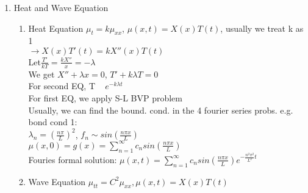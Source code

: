 \documentclass[10pt]{article}
\begin{document}
\begin{multicols}{2}
\begin{enumerate}
\begin{enumerate}
		\end{enumerate}
	
	\item Heat and Wave Equation
		\begin{enumerate}
			\item Heat Equation
				$\mu_t = k\mu_{xx}$, $\mu(x,t) = X(x)T(t)$, usually we treat k as 1\\
				$\rightarrow X(x)T'(t) = kX''(x)T(t)$\\
				Let$\frac{T'}{kT} = \frac{kX''}{x} = -\lambda$\\
				We get $X'' + \lambda x = 0$, $T' + k\lambda T = 0$\\
				For second EQ, T ~ $e^{-k\lambda t}$\\
				For first EQ, we apply S-L BVP problem\\
				Usually, we can find the bound. cond. in the 4 fourier series probs.
				e.g. bond cond 1:\\
				$\lambda_n = (\frac{n \pi}{L})^2$, $f_n \sim sin(\frac{n \pi x}{L})$\\
				$\mu (x,0) = g(x) = \sum_{n = 1}^{\infty}c_n sin(\frac{n\pi x}{L})$\\
				Fouries formal solution: $\mu (x,t) = \sum_{n = 1}^{\infty}c_nsin(\frac{n \pi x}{L})e^{-\frac{n^2\pi^2}{L^2}t}$ 
			\item Wave Equation
				$\mu_{tt} = C^2\mu_{xx}, \mu(x,t) = X(x)T(t)$
				
				
				
	    \end{enumerate}
	
\end{enumerate}
\newpage
\end{multicols}
\end{document}
